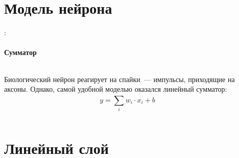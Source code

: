 \documentclass{beamer}
\begin{document}
\begin{frame}
  \tableofcontents
\end{frame}

\section{Модель нейрона}

\begin{frame}{\secname : \subsecname}
  \framesubtitle{Сумматор}
  \begin{columns}

    \begin{column}{0.5\textwidth}
      Биологический нейрон реагирует на спайки~--- импульсы,
      приходящие на аксоны. Однако, самой удобной моделью оказался
      линейный сумматор:
      $$ y = \sum_{i}^{} w_i \cdot x_i + b $$
    \end{column}

    \begin{column}{0.5\textwidth}
      \begin{center}
      \end{center}
    \end{column}

  \end{columns}
\end{frame}

\section{Линейный слой}
\end{document}
